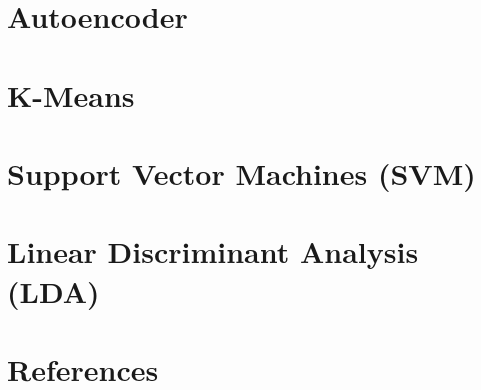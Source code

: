 \documentclass{article}
\begin{document}
\section{Autoencoder}

\section{K-Means}

\section{Support Vector Machines (SVM)}

\section{Linear Discriminant Analysis (LDA)}

\section*{References}
\end{document}

